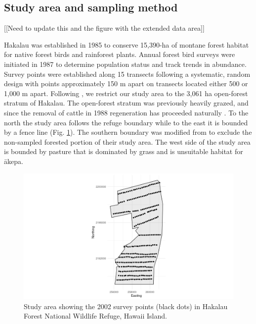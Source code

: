 \documentclass[preprint,12pt]{elsarticle}
\newcommand{\akepa}{\textquotesingle\={a}kepa}  %
\newcommand{\hawaii}{Hawai\textquotesingle i}   %
\begin{document}
\subsection{Study area and sampling method}

[[Need to update this and the figure with the extended data area]]

Hakalau was established in 1985 to conserve 15,390-ha of montane forest habitat for native forest birds and rainforest plants. Annual forest bird surveys were initiated in 1987 to determine population status and track trends in abundance. Survey points were established along 15 transects following a systematic, random design with points approximately 150 m apart on transects located either 500 or 1,000 m apart. Following \cite{camp_population_2010, camp_statespace_2016}, we restrict our study area to the 3,061 ha open-forest stratum of Hakalau.  The open-forest stratum was previously heavily grazed, and since the removal of cattle in 1988 regeneration has proceeded naturally \citep{maxfield_hakalau_1998}. To the north the study area follows the refuge boundary while to the east it is bounded by a fence line (Fig. \ref{fig:2002studyareapointspt}). The southern boundary was modified from \cite{camp_population_2010} to exclude the non-sampled forested portion of their study area. The west side of the study area is bounded by pasture that is dominated by grass and is unsuitable habitat for \akepa.

\begin{figure}
	\centering
	\includegraphics[scale=0.5]{figures/study_area_design.png}
	\caption{Study area showing the 2002 survey points (black dots) in Hakalau Forest National Wildlife Refuge, \hawaii{} Island.}
	\label{fig:2002studyareapointspt}
\end{figure}
\end{document}

